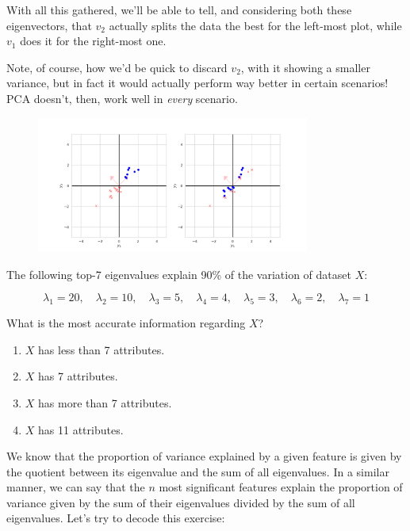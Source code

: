 \documentclass[12pt]{article}
\begin{document}
\begin{enumerate}[leftmargin=\labelsep]
  With all this gathered, we'll be able to tell, and considering both
  these eigenvectors, that $v_2$ actually splits the data the best for the
  left-most plot, while $v_1$ does it for the right-most one.

  Note, of course, how we'd be quick to discard $v_2$, with it showing
  a smaller variance, but in fact it would actually perform way better in
  certain scenarios! PCA doesn't, then, work well in \textit{every} scenario.

  \begin{figure}[H]
    \centering
    \includegraphics[width=0.8\textwidth]{assets/ex-2/scaled-samples.png}
    \label{fig:samples-2-scaled}
  \end{figure}

  \begin{tcolorbox}[enhanced jigsaw,halign=center,colback=bg,boxrule=0pt,arc=1pt]
    \item The following top-7 eigenvalues explain 90\% of the variation of dataset $X$:

    \begin{equation*}
      \lambda_1 = 20, \quad \lambda_2 = 10, \quad \lambda_3 = 5, \quad \lambda_4 = 4, \quad \lambda_5 = 3, \quad \lambda_6 = 2, \quad \lambda_7 = 1
    \end{equation*}

    What is the most accurate information regarding $X$?

    \begin{enumerate}
      \item $X$ has less than 7 attributes.
      \item $X$ has 7 attributes.
      \item $X$ has more than 7 attributes.
      \item $X$ has 11 attributes.
    \end{enumerate}
  \end{tcolorbox}

  We know that the proportion of variance explained by a given feature
  is given by the quotient between its eigenvalue and the sum of all
  eigenvalues. In a similar manner, we can say that the $n$ most significant
  features explain the proportion of variance given by the sum of their
  eigenvalues divided by the sum of all eigenvalues. Let's try to decode this exercise:


\end{enumerate}
\end{document}
